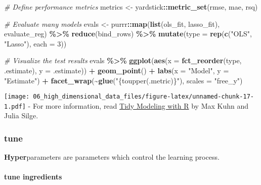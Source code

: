 \documentclass[
]{book}
\newenvironment{Shaded}{\begin{snugshade}}{\end{snugshade}}
\newcommand{\CommentTok}[1]{\textcolor[rgb]{0.56,0.35,0.01}{\textit{#1}}}
\newcommand{\DataTypeTok}[1]{\textcolor[rgb]{0.13,0.29,0.53}{#1}}
\newcommand{\DecValTok}[1]{\textcolor[rgb]{0.00,0.00,0.81}{#1}}
\newcommand{\KeywordTok}[1]{\textcolor[rgb]{0.13,0.29,0.53}{\textbf{#1}}}
\newcommand{\NormalTok}[1]{#1}
\newcommand{\OperatorTok}[1]{\textcolor[rgb]{0.81,0.36,0.00}{\textbf{#1}}}
\newcommand{\StringTok}[1]{\textcolor[rgb]{0.31,0.60,0.02}{#1}}
\begin{document}
\begin{Shaded}
\begin{Highlighting}[]
\CommentTok{\# Define performance metrics }
\NormalTok{metrics \textless{}{-}}\StringTok{ }\NormalTok{yardstick}\OperatorTok{::}\KeywordTok{metric\_set}\NormalTok{(rmse, mae, rsq)}

\CommentTok{\# Evaluate many models }
\NormalTok{evals \textless{}{-}}\StringTok{ }\NormalTok{purrr}\OperatorTok{::}\KeywordTok{map}\NormalTok{(}\KeywordTok{list}\NormalTok{(ols\_fit, lasso\_fit), evaluate\_reg) }\OperatorTok{\%\textgreater{}\%}
\StringTok{  }\KeywordTok{reduce}\NormalTok{(bind\_rows) }\OperatorTok{\%\textgreater{}\%}
\StringTok{  }\KeywordTok{mutate}\NormalTok{(}\DataTypeTok{type =} \KeywordTok{rep}\NormalTok{(}\KeywordTok{c}\NormalTok{(}\StringTok{"OLS"}\NormalTok{, }\StringTok{"Lasso"}\NormalTok{), }\DataTypeTok{each =} \DecValTok{3}\NormalTok{))}

\CommentTok{\# Visualize the test results }
\NormalTok{evals }\OperatorTok{\%\textgreater{}\%}
\StringTok{  }\KeywordTok{ggplot}\NormalTok{(}\KeywordTok{aes}\NormalTok{(}\DataTypeTok{x =} \KeywordTok{fct\_reorder}\NormalTok{(type, .estimate), }\DataTypeTok{y =}\NormalTok{ .estimate)) }\OperatorTok{+}
\StringTok{    }\KeywordTok{geom\_point}\NormalTok{() }\OperatorTok{+}
\StringTok{    }\KeywordTok{labs}\NormalTok{(}\DataTypeTok{x =} \StringTok{"Model"}\NormalTok{,}
         \DataTypeTok{y =} \StringTok{"Estimate"}\NormalTok{) }\OperatorTok{+}
\StringTok{    }\KeywordTok{facet\_wrap}\NormalTok{(}\OperatorTok{\textasciitilde{}}\KeywordTok{glue}\NormalTok{(}\StringTok{"\{toupper(.metric)\}"}\NormalTok{), }\DataTypeTok{scales =} \StringTok{"free\_y"}\NormalTok{) }
\end{Highlighting}
\end{Shaded}

\texttt{[image: 06\_high\_dimensional\_data\_files/figure-latex/unnamed-chunk-17-1.pdf]}
- For more information, read \href{https://www.tmwr.org/}{Tidy Modeling with R} by Max Kuhn and Julia Silge.

\hypertarget{tune}{%
\subsubsection{tune}\label{tune}}

\textbf{Hyper}parameters are parameters which control the learning process.

\hypertarget{tune-ingredients}{%
\paragraph{tune ingredients}\label{tune-ingredients}}
\end{document}
